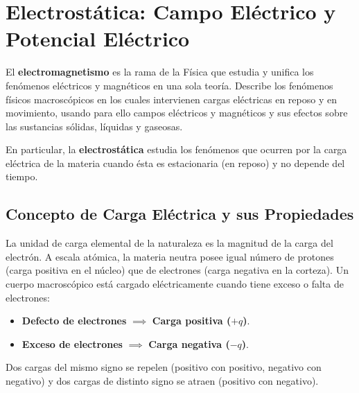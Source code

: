 \section{Electrostática: Campo Eléctrico y Potencial Eléctrico}

El \textbf{electromagnetismo} es la rama de la Física que estudia y unifica los fenómenos eléctricos y magnéticos en una sola teoría. Describe los fenómenos físicos macroscópicos en los cuales intervienen cargas eléctricas en reposo y en movimiento, usando para ello campos eléctricos y magnéticos y sus efectos sobre las sustancias sólidas, líquidas y gaseosas.

En particular, la \textbf{electrostática} estudia los fenómenos que ocurren por la carga eléctrica de la materia cuando ésta es estacionaria (en reposo) y no depende del tiempo.

\subsection{Concepto de Carga Eléctrica y sus Propiedades}

La unidad de carga elemental de la naturaleza es la magnitud de la carga del electrón. A escala atómica, la materia neutra posee igual número de protones (carga positiva en el núcleo) que de electrones (carga negativa en la corteza). Un cuerpo macroscópico está cargado eléctricamente cuando tiene exceso o falta de electrones:
\begin{itemize}[leftmargin=*]
    \item \textbf{Defecto de electrones} $\implies$ \textbf{Carga positiva ($+q$)}.
    \item \textbf{Exceso de electrones} $\implies$ \textbf{Carga negativa ($-q$)}.
\end{itemize}
Dos cargas del mismo signo se repelen (positivo con positivo, negativo con negativo) y dos cargas de distinto signo se atraen (positivo con negativo).

